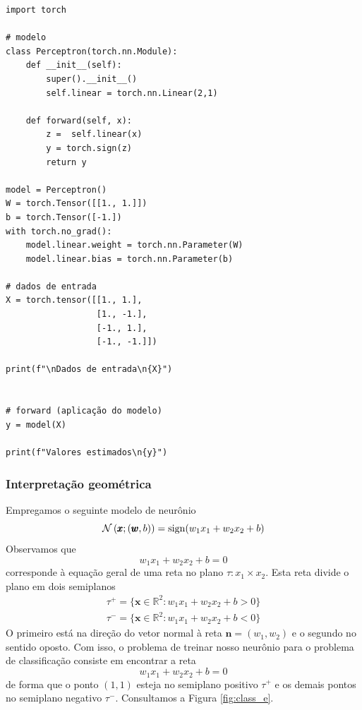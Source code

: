 \begin{lstlisting}[caption=perceptron.py, label=cap_perceptron_sec_unit:cod:perceptron]
import torch

# modelo
class Perceptron(torch.nn.Module):
    def __init__(self):
        super().__init__()
        self.linear = torch.nn.Linear(2,1)

    def forward(self, x):
        z =  self.linear(x)
        y = torch.sign(z)
        return y

model = Perceptron()
W = torch.Tensor([[1., 1.]])
b = torch.Tensor([-1.])
with torch.no_grad():
    model.linear.weight = torch.nn.Parameter(W)
    model.linear.bias = torch.nn.Parameter(b)

# dados de entrada
X = torch.tensor([[1., 1.],
                  [1., -1.],
                  [-1., 1.],
                  [-1., -1.]])

print(f"\nDados de entrada\n{X}")


# forward (aplicação do modelo)
y = model(X)

print(f"Valores estimados\n{y}")
\end{lstlisting}

\subsubsection{Interpretação geométrica}

Empregamos o seguinte modelo de neurônio
\begin{equation}
  \mathcal{N}\left(\pmb{x}; (\pmb{w}, b)\right) = \operatorname{sign}(w_1x_1 + w_2x_2 + b)
\end{equation}
Observamos que
\begin{equation}
  w_1x_1 + w_2x_2 + b = 0
\end{equation}
corresponde à equação geral de uma reta no plano $\tau: x_1\times x_2$. Esta reta divide o plano em dois semiplanos
\begin{align}
  \tau^+ = \{\pmb{x}\in\mathbb{R}^2: w_1x_1 + w_2x_2 + b > 0\}\\
  \tau^- = \{\pmb{x}\in\mathbb{R}^2: w_1x_1 + w_2x_2 + b < 0\}
\end{align}
O primeiro está na direção do vetor normal à reta $\pmb{n} = (w_1, w_2)$ e o segundo no sentido oposto. Com isso, o problema de treinar nosso neurônio para o problema de classificação consiste em encontrar a reta
\begin{equation}
  w_1x_1 + w_2x_2 + b = 0
\end{equation}
de forma que o ponto $(1, 1)$ esteja no semiplano positivo $\tau^+$ e os demais pontos no semiplano negativo $\tau^-$. Consultamos a Figura \ref{fig:class_e}.

